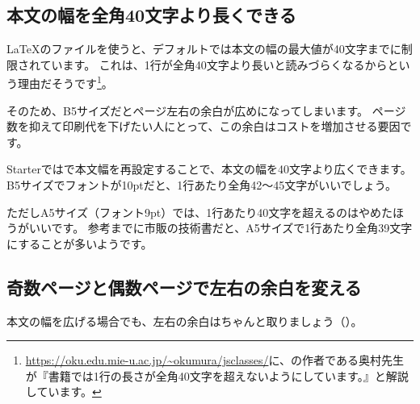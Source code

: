 \subsection*{本文の幅を全角40文字より長くできる}
\label{sec:1-2-4}

\LaTeX{}のファイルを使うと、デフォルトでは本文の幅の最大値が40文字までに制限されています。
これは、1行が全角40文字より長いと読みづらくなるからという理由だそうです\footnote{\url{https://oku.edu.mie-u.ac.jp/~okumura/jsclasses/}に、の作者である奥村先生が『書籍では1行の長さが全角40文字を超えないようにしています。』と解説しています。}。

そのため、B5サイズだとページ左右の余白が広めになってしまいます。
ページ数を抑えて印刷代を下げたい人にとって、この余白はコストを増加させる要因です。

Starterではで本文幅を再設定することで、本文の幅を40文字より広くできます。
B5サイズでフォントが10ptだと、1行あたり全角42〜45文字がいいでしょう。

ただしA5サイズ（フォント9pt）では、1行あたり40文字を超えるのはやめたほうがいいです。
参考までに市販の技術書だと、A5サイズで1行あたり全角39文字にすることが多いようです。

\subsection*{奇数ページと偶数ページで左右の余白を変える}
\label{sec:1-2-5}
\label{jwevu}

本文の幅を広げる場合でも、左右の余白はちゃんと取りましょう（）。

